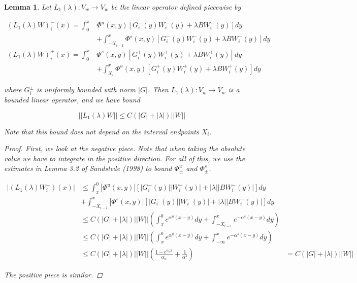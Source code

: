 \documentclass[12pt]{article}
\newtheorem{lemma}{Lemma}
\begin{document}
\begin{lemma}

Let $L_1(\lambda): V_w \rightarrow V_w$ be the linear operator defined piecewise by

\begin{align*}
(L_1(\lambda)W)_i^-(x) = \int_0^x &\Phi^u(x, y)[G_i^-(y) W_i^-(y) + \lambda B W_i^-(y) ] dy \\
&+ \int_{-X_{i-1}}^x \Phi^s(x, y)[G_i^-(y) W_i^-(y) + \lambda B W_i^-(y) ] dy \\
(L_1(\lambda)W)_i^+(x) = \int_0^x &\Phi^s(x, y)[G_i^+(y) W_i^+(y) + \lambda B W_i^+(y)] dy \\
&+ \int_{X_{i}}^x \Phi^u(x, y)[G_i^+(y) W_i^+(y) + \lambda B W_i^+(y) ] dy
\end{align*}

where $G_i^\pm$ is uniformly bounded with norm $|G|$. Then $L_1(\lambda): V_w \rightarrow V_w$ is a bounded linear operator, and we have bound

\begin{equation}
||L_1(\lambda)W|| \leq C\left(|G| +|\lambda|\right)||W||
\end{equation}

Note that this bound does not depend on the interval endpoints $X_i$.

\begin{proof}
First, we look at the negative piece. Note that when taking the absolute value we have to integrate in the positive direction. For all of this, we use the estimates in Lemma 3.2 of Sandstede (1998) to bound $\Phi^u_\pm$ and $\Phi^s_\pm$.

\begin{align*}
|(L_1(\lambda)W_i^-)(x) | &\leq \int_x^0 |\Phi^u(x, y)|[|G_i^-(y)||W_i^-(y)| + |\lambda||B W_i^-(y)| ] dy \\
&+ \int_{-X_{i-1}}^x |\Phi^s(x, y)|[|G_i^-(y)||W_i^-(y)| + |\lambda||B W_i^-(y)| ] dy \\
&\leq C(|G| + |\lambda|) ||W|| \left( \int_x^0 e^{\alpha^u (x-y)} dy + \int_{-X_{i-1}}^x e^{-\alpha^s (x-y)} dy \right) \\
&\leq C(|G| + |\lambda|) ||W|| \left( \int_x^0 e^{\alpha^u (x-y)} dy + \int_{-\infty}^x e^{-\alpha^s (x-y)} dy \right) \\
&\leq C(|G| + |\lambda|) ||W|| \left( \frac{1 - e^{\alpha_u x}}{\alpha_u} + \frac{1}{\alpha^s} \right)
&= C (|G| + |\lambda|) ||W|| 
\end{align*}

The positive piece is similar.

\end{proof}
\end{lemma}
\end{document}
